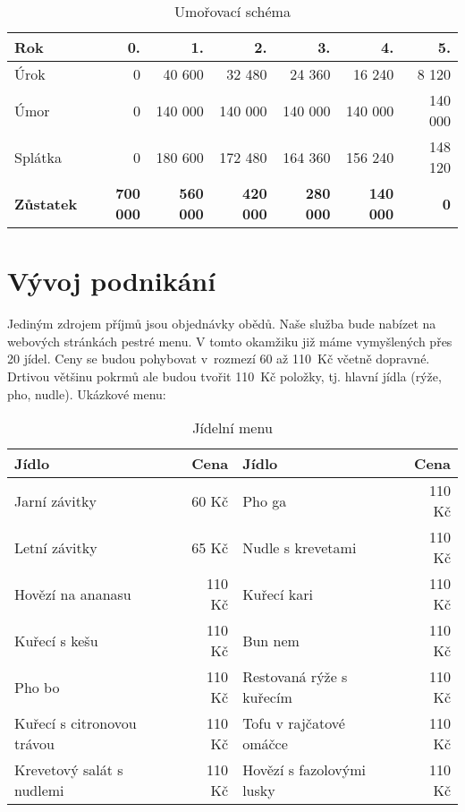 \begin{table}[htbp]
\begin{center}
\begin{tabular}{ l r r r r r r }

\textbf{Rok} & \textbf{0.} & \textbf{1.} & \textbf{2.} & \textbf{3.} & \textbf{4.} & \textbf{5.} \\ \hline
Úrok & 0 & 40 600 & 32 480 & 24 360 & 16 240 & 8 120 \\
Úmor & 0 & 140 000 & 140 000 & 140 000 & 140 000 & 140 000 \\
Splátka & 0 & 180 600 & 172 480 & 164 360 & 156 240 & 148 120 \\ \hline
\textbf{Zůstatek} & \textbf{700 000} & \textbf{560 000} & \textbf{420 000} & \textbf{280 000} & \textbf{140 000} & \textbf{0} \\

\end{tabular}
\caption{Umořovací schéma}
\label{umorovaci_schema}
\end{center}
\end{table}


\newpage



\section{Vývoj podnikání}
Jediným zdrojem příjmů jsou objednávky obědů. Naše služba bude nabízet na webových stránkách pestré menu. V tomto okamžiku již máme vymyšlených přes 20 jídel. Ceny se budou pohybovat v~rozmezí 60 až 110~Kč včetně dopravné. Drtivou většinu pokrmů ale budou tvořit 110~Kč položky, tj. hlavní jídla (rýže, pho, nudle). Ukázkové menu:

\begin{table}[htbp]
\begin{center}
\begin{tabular}{ l r | l r }

\textbf{Jídlo} & \textbf{Cena} & \textbf{Jídlo} & \textbf{Cena} \\ \hline
Jarní závitky & 60 Kč & Pho ga & 110 Kč \\ 
Letní závitky & 65 Kč & Nudle s krevetami & 110 Kč \\ 
Hovězí na ananasu & 110 Kč & Kuřecí kari & 110 Kč \\ 
Kuřecí s kešu & 110 Kč & Bun nem & 110 Kč \\ 
Pho bo & 110 Kč & Restovaná rýže s kuřecím & 110 Kč \\ 
Kuřecí s citronovou trávou & 110 Kč & Tofu v rajčatové omáčce & 110 Kč \\ 
Krevetový salát s nudlemi & 110 Kč & Hovězí s fazolovými lusky & 110 Kč \\ 

\end{tabular}
\caption{Jídelní menu}
\label{jidelni_menu}
\end{center}
\end{table}

